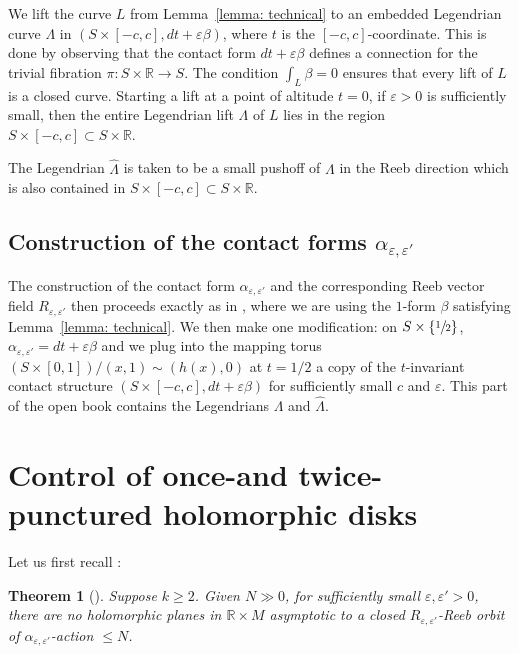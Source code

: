 \documentclass[10pt]{amsart}
\theoremstyle{plain}
\newtheorem{thm}{Theorem}[section]
\theoremstyle{definition}
\numberwithin{equation}{subsection}
\newcommand{\RR}{\mathbb{R}}
\begin{document}
We lift the curve $L$ from Lemma~\ref{lemma: technical} to an embedded Legendrian curve $\Lambda$ in \hbox{$(S\times [-c,c] ,dt+\varepsilon \beta)$}, where $t$ is the $[-c,c]$-coordinate. This is done by observing that the contact form $dt+\varepsilon \beta$ defines a connection for the trivial fibration $\pi : S\times \RR \to S$.
The condition $\int_{L} \beta =0$ ensures that every lift of $L$ is a closed curve. Starting a lift at a point of altitude $t=0$, if $\varepsilon>0$ is sufficiently small, then the entire Legendrian lift $\Lambda$ of $L$ lies in the region $S\times [-c,c] \subset S\times \RR$.

The Legendrian $\widehat{\Lambda}$ is taken to be a small pushoff of $\Lambda$ in the Reeb direction which is also contained in $S\times [-c,c] \subset S\times \RR$.

\subsection{Construction of the contact forms $\alpha_{\varepsilon,\varepsilon'}$}\label{subsection: construction of forms}

The construction of the contact form $\alpha_{\varepsilon, \varepsilon'}$ and the corresponding Reeb vector field $R_{\varepsilon,\varepsilon'}$ then proceeds exactly as in \cite[\S 6.2]{CH2}, where we are using the $1$-form $\beta$ satisfying Lemma~\ref{lemma: technical}. We then make one modification: on $S\times\{\sfrac{1}{2}\}$, $\alpha_{\varepsilon,\varepsilon'}= dt+\varepsilon\beta$ and we plug into the mapping torus $(S\times [0,1])/(x,1)\sim(h(x),0)$ at $t={1/2}$ a copy of the $t$-invariant contact structure $(S\times [-c,c] , dt+\varepsilon \beta)$ for sufficiently small $c$ and $\varepsilon$. This part of the open book contains the Legendrians $\Lambda$ and $\widehat\Lambda$.

\section{Control of once-and twice-punctured holomorphic disks}

Let us first recall \cite[Th.\,8.1]{CH2}:

\begin{thm}[\cite{CH2}]\label{thm: planes}
Suppose $k\!\geq\!2$. Given $N\!\gg\!0$, for sufficiently small \hbox{$\varepsilon,\varepsilon'\!>\!0$}, there are no holomorphic planes in $\RR\times M$ asymptotic to a closed $R_{\varepsilon,\varepsilon'}$-Reeb orbit of $\alpha_{\varepsilon,\varepsilon'}$-action $\leq N$.
\end{thm}
\end{document}
